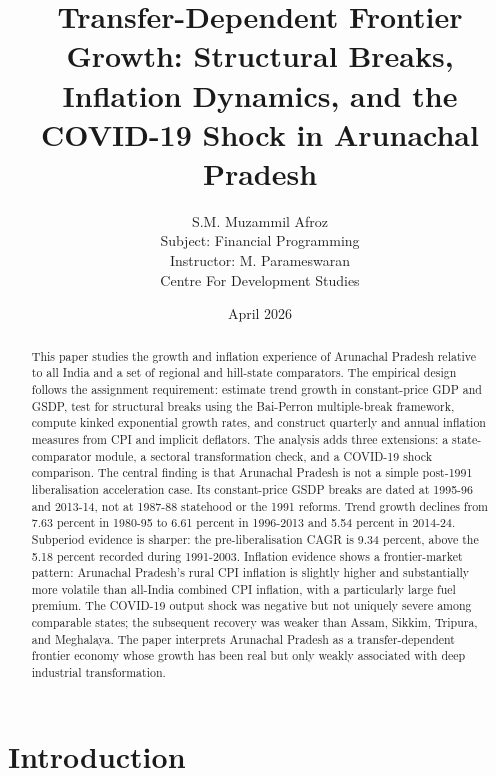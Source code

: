 \documentclass[11pt,a4paper]{article}
\begin{document}
\title{\textbf{Transfer-Dependent Frontier Growth: Structural Breaks, Inflation Dynamics, and the COVID-19 Shock in Arunachal Pradesh}}
\author{S.M. Muzammil Afroz\\
Subject: Financial Programming\\
Instructor: M. Parameswaran\\
Centre For Development Studies}
\date{April 2026}
\maketitle

\begin{abstract}
This paper studies the growth and inflation experience of Arunachal Pradesh relative to all India and a set of regional and hill-state comparators. The empirical design follows the assignment requirement: estimate trend growth in constant-price GDP and GSDP, test for structural breaks using the Bai-Perron multiple-break framework, compute kinked exponential growth rates, and construct quarterly and annual inflation measures from CPI and implicit deflators. The analysis adds three extensions: a state-comparator module, a sectoral transformation check, and a COVID-19 shock comparison. The central finding is that Arunachal Pradesh is not a simple post-1991 liberalisation acceleration case. Its constant-price GSDP breaks are dated at 1995-96 and 2013-14, not at 1987-88 statehood or the 1991 reforms. Trend growth declines from 7.63 percent in 1980-95 to 6.61 percent in 1996-2013 and 5.54 percent in 2014-24. Subperiod evidence is sharper: the pre-liberalisation CAGR is 9.34 percent, above the 5.18 percent recorded during 1991-2003. Inflation evidence shows a frontier-market pattern: Arunachal Pradesh's rural CPI inflation is slightly higher and substantially more volatile than all-India combined CPI inflation, with a particularly large fuel premium. The COVID-19 output shock was negative but not uniquely severe among comparable states; the subsequent recovery was weaker than Assam, Sikkim, Tripura, and Meghalaya. The paper interprets Arunachal Pradesh as a transfer-dependent frontier economy whose growth has been real but only weakly associated with deep industrial transformation.
\end{abstract}

\tableofcontents
\newpage

\section{Introduction}
\end{document}
